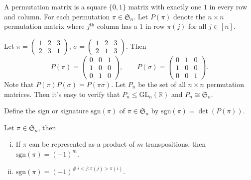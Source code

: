 \begin{definition}
A permutation matrix is a square $\{0,1\}$ matrix with exactly one $1$ in every row and column. For each permutation $\pi\in\mathfrak{S}_n$. Let $P(\pi)$ denote the $n\times n$ permutation matrix where $j^{\textrm{th}}$ column has a $1$ in row $\pi(j)$ for all $j\in[n]$.
\end{definition}
\begin{example}
Let $\pi=\begin{pmatrix}
1&2&3\\
2&3&1
\end{pmatrix}$, $\sigma=\begin{pmatrix}
1&2&3\\
2&1&3
\end{pmatrix}$. Then 
\[P(\pi)=\begin{pmatrix}
0&0&1\\
1&0&0\\
0&1&0
\end{pmatrix},\qquad 
P(\sigma)=\begin{pmatrix}
0&1&0\\
1&0&0\\
0&0&1
\end{pmatrix}.\]
Note that $P(\pi)P(\sigma)=P(\pi\sigma).$ Let $P_n$ be the set of all $n\times n$ permutation matrices. Then it's easy to verify that $P_n\leq \mathrm{GL}_n(\mathbb{R})$ and $P_n\cong \mathfrak{S}_n$.
\end{example}

\begin{definition}
Define the sign or signature $\mathrm{sgn}(\pi)$ of $\pi\in\mathfrak{S}_n$ by $\mathrm{sgn}(\pi)=\det(P(\pi))$.
\end{definition}

\begin{lemma}
Let $\pi\in\mathfrak{S}_n$, then
\begin{enumerate}[(i)]
\item If $\pi$ can be represented as a product of $m$ transpositions, then $\mathrm{sgn}(\pi)=(-1)^m$.
\item $\mathrm{sgn}(\pi) = (-1)^{\#\, i<j:\pi(j)>\pi(i)}$.
\end{enumerate}
\end{lemma}

